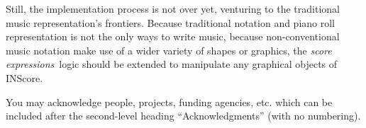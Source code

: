 \documentclass{article}
\newenvironment{ExprCode}		{\vspace{-2mm} \small\verbatim}{\endverbatim\vspace{-2mm}}
\newcommand{\sExpr}{\emph{score expressions}}
\begin{document}
Still, the implementation process is not over yet, venturing to the traditional music representation's frontiers. Because traditional notation and piano roll representation is not the only ways to write music, because non-conventional music notation make use of a wider variety of shapes or graphics, the \sExpr\ logic should be extended to manipulate any graphical objects of INScore.


\begin{acknowledgments}
You may acknowledge people, projects, 
funding agencies, etc. 
which can be included after the second-level heading
``Acknowledgments'' (with no numbering).
\end{acknowledgments} 



%               
%      
\end{document}
